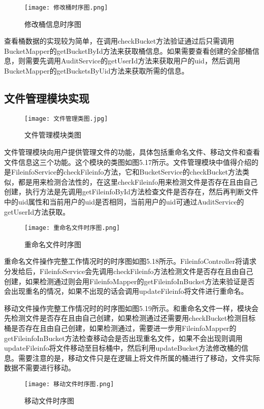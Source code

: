 \begin{figure}
  \centering
  \texttt{[image: 修改桶时序图.png]}
  \caption{修改桶信息时序图}
\end{figure}

查看桶数据的实现较为简单，在调用checkBucket方法验证通过后只需调用BucketMapper的getBucketById方法来获取桶信息。如果需要查看创建的全部桶信息，则需要先调用AuditService的getUserId方法来获取用户的uid，然后调用BucketMapper的getBucketsByUid方法来获取所需的信息。

\subsection{文件管理模块实现}

\begin{figure}
  \centering
  \texttt{[image: 文件管理类图.jpg]}
  \caption{文件管理模块类图}
\end{figure}

文件管理模块向用户提供管理文件的功能，具体包括重命名文件、移动文件和查看文件信息这三个功能。这个模块的类图如图5.17所示。文件管理模块中值得介绍的是FileinfoService的checkFileinfo方法，它和BucketService的checkBucket方法类似，都是用来检测合法性的，在这里checkFileinfo用来检测文件是否存在且由自己创建，执行方法是先调用getFileinfoById方法检查文件是否存在，然后再判断文件中的uid属性和当前用户的uid是否相同，当前用户的uid可通过AuditService的getUserId方法获取。

\begin{figure}
  \centering
  \texttt{[image: 重命名文件时序图.png]}
  \caption{重命名文件时序图}
\end{figure}

重命名文件操作完整工作情况时的时序图如图5.18所示。FileinfoController将请求分发给后，FileinfoService会先调用checkFileinfo方法检测文件是否存在且由自己创建，如果检测通过则会用FileinfoMapper的getFileinfoInBucket方法来验证是否会出现重名的情况，如果不出现的话会调用updateFileinfo将文件进行重命名。

移动文件操作完整工作情况时的时序图如图5.19所示。和重命名文件一样，模块会先检测文件是否存在且由自己创建，如果检测通过还需要用checkBucket检测目标桶是否存在且由自己创建，如果检测通过，需要进一步用FileinfoMapper的getFileinfoInBucket方法检查移动会是否出现重名文件，如果不会出现则调用updateFileinfo将文件移动至目标桶中，然后利用updateBucket方法修改桶的信息。需要注意的是，移动文件只是在逻辑上将文件所属的桶进行了移动，文件实际数据不需要进行移动。

\begin{figure}
  \centering
  \texttt{[image: 移动文件时序图.png]}
  \caption{移动文件时序图}
\end{figure}

